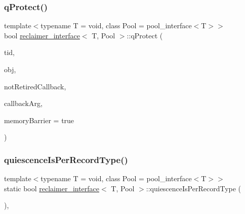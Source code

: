 \subsubsection{\texorpdfstring{q\+Protect()}{qProtect()}}
{\footnotesize\ttfamily template$<$typename T  = void, class Pool  = pool\+\_\+interface$<$\+T$>$$>$ \\
bool \hyperlink{classreclaimer__interface}{reclaimer\+\_\+interface}$<$ T, Pool $>$\+::q\+Protect (\begin{DoxyParamCaption}\item[{const int}]{tid,  }\item[{T $\ast$}]{obj,  }\item[{\hyperlink{globals_8h_a57f5c0d40b156d7d996492fb2f16e3cd}{Callback\+Type}}]{not\+Retired\+Callback,  }\item[{\hyperlink{globals_8h_a3de64ef48066ac6430631c8b81a15345}{Callback\+Arg}}]{callback\+Arg,  }\item[{bool}]{memory\+Barrier = {\ttfamily true} }\end{DoxyParamCaption})\hspace{0.3cm}{\ttfamily [inline]}}

\mbox{\label{classreclaimer__interface_a3b93587337b561201d7fa8ab36f64d9d}} 
\subsubsection{\texorpdfstring{quiescence\+Is\+Per\+Record\+Type()}{quiescenceIsPerRecordType()}}
{\footnotesize\ttfamily template$<$typename T  = void, class Pool  = pool\+\_\+interface$<$\+T$>$$>$ \\
static bool \hyperlink{classreclaimer__interface}{reclaimer\+\_\+interface}$<$ T, Pool $>$\+::quiescence\+Is\+Per\+Record\+Type (\begin{DoxyParamCaption}{ }\end{DoxyParamCaption})\hspace{0.3cm}{\ttfamily [inline]}, {\ttfamily [static]}}

\mbox{\label{classreclaimer__interface_a0893dc3706f43bfeb5572808bba6b92a}} 

